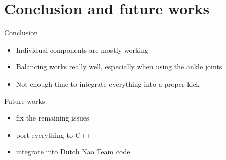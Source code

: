 \documentclass{beamer}
\begin{document}
\section{Conclusion and future works}

\begin{frame}{Conclusion}
  \begin{itemize}
    \item Individual components are mostly working
    \item Balancing works really well, especially when using the ankle joints
    \item Not enough time to integrate everything into a proper kick
  \end{itemize}
\end{frame}

\begin{frame}{Future works}
  \begin{itemize}
    \item fix the remaining issues
    \item port everything to C++
    \item integrate into Dutch Nao Team code
  \end{itemize}
\end{frame}
\end{document}
